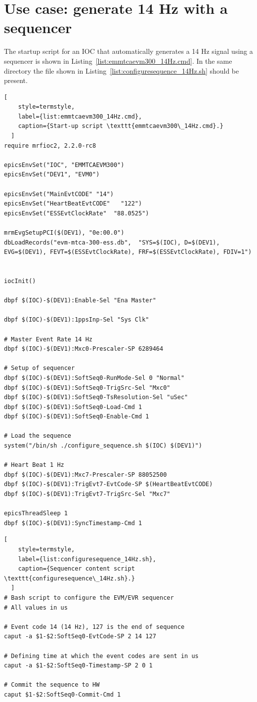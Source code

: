 \documentclass[11pt
  , a4paper
  , article
  , oneside
  , showtrims
]{memoir}
\begin{document}
\chapter{Use case: generate 14 Hz with a sequencer}
The startup script for an IOC that automatically generates a 14 Hz signal using a sequencer is shown in Listing~\ref{list:emmtcaevm300_14Hz.cmd}. In the same directory the file shown in Listing~\ref{list:configuresequence_14Hz.sh} should be present.
\begin{lstlisting}[
    style=termstyle,
    label={list:emmtcaevm300_14Hz.cmd},
    caption={Start-up script \texttt{emmtcaevm300\_14Hz.cmd}.}
  ]
require mrfioc2, 2.2.0-rc8

epicsEnvSet("IOC", "EMMTCAEVM300")
epicsEnvSet("DEV1", "EVM0")

epicsEnvSet("MainEvtCODE" "14")
epicsEnvSet("HeartBeatEvtCODE"   "122")
epicsEnvSet("ESSEvtClockRate"  "88.0525")

mrmEvgSetupPCI($(DEV1), "0e:00.0")
dbLoadRecords("evm-mtca-300-ess.db",  "SYS=$(IOC), D=$(DEV1), EVG=$(DEV1), FEVT=$(ESSEvtClockRate), FRF=$(ESSEvtClockRate), FDIV=1")


iocInit()

dbpf $(IOC)-$(DEV1):Enable-Sel "Ena Master"

dbpf $(IOC)-$(DEV1):1ppsInp-Sel "Sys Clk"

# Master Event Rate 14 Hz
dbpf $(IOC)-$(DEV1):Mxc0-Prescaler-SP 6289464

# Setup of sequencer
dbpf $(IOC)-$(DEV1):SoftSeq0-RunMode-Sel 0 "Normal"
dbpf $(IOC)-$(DEV1):SoftSeq0-TrigSrc-Sel "Mxc0"
dbpf $(IOC)-$(DEV1):SoftSeq0-TsResolution-Sel "uSec"
dbpf $(IOC)-$(DEV1):SoftSeq0-Load-Cmd 1
dbpf $(IOC)-$(DEV1):SoftSeq0-Enable-Cmd 1

# Load the sequence
system("/bin/sh ./configure_sequence.sh $(IOC) $(DEV1)")

# Heart Beat 1 Hz
dbpf $(IOC)-$(DEV1):Mxc7-Prescaler-SP 88052500
dbpf $(IOC)-$(DEV1):TrigEvt7-EvtCode-SP $(HeartBeatEvtCODE)
dbpf $(IOC)-$(DEV1):TrigEvt7-TrigSrc-Sel "Mxc7"

epicsThreadSleep 1
dbpf $(IOC)-$(DEV1):SyncTimestamp-Cmd 1
\end{lstlisting}

\begin{lstlisting}[
    style=termstyle,
    label={list:configuresequence_14Hz.sh},
    caption={Sequencer content script \texttt{configuresequence\_14Hz.sh}.}
  ]
# Bash script to configure the EVM/EVR sequencer
# All values in us

# Event code 14 (14 Hz), 127 is the end of sequence
caput -a $1-$2:SoftSeq0-EvtCode-SP 2 14 127

# Defining time at which the event codes are sent in us
caput -a $1-$2:SoftSeq0-Timestamp-SP 2 0 1

# Commit the sequence to HW
caput $1-$2:SoftSeq0-Commit-Cmd 1
\end{lstlisting}
\end{document}
